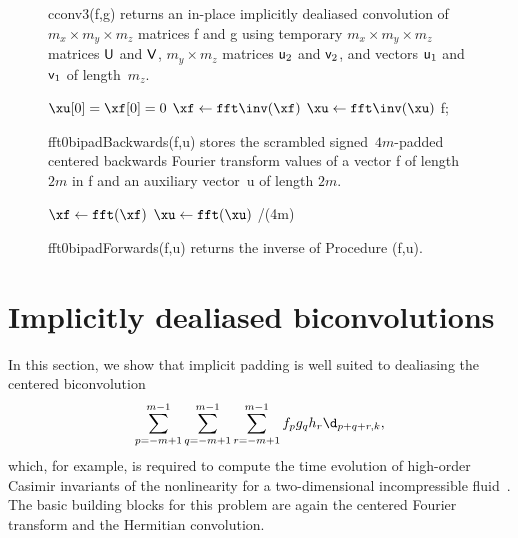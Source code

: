\documentclass[final]{siamltex}
\begin{document}
\begin{figure}[htbp]
\begin{minipage}{0.54\linewidth}
\begin{function}[H]
  \Return \xf\;
\caption{cconv3({\sf f},{\sf g}) 
returns an in-place implicitly dealiased convolution of
\hbox{$m_x\times m_y\times m_z$} matrices {\sf f} and {\sf g} using temporary
\hbox{$m_x\times m_y\times m_z$} matrices ${\sf U}$ and ${\sf V}$, 
$m_y\times m_z$ matrices ${\sf u}_2$ and ${\sf v}_2$,
and vectors ${\sf u}_1$ and ${\sf v}_1$ of length~$m_z$.}\label{cconv3}
\end{function}
\end{minipage}
%
\begin{minipage}{0.46\linewidth}
\begin{procedure}[H]
  $\xu[0]=\xf[0]=0$\;
  $\xf \leftarrow \fft\inv(\xf)$\;
  $\xu \leftarrow \fft\inv(\xu)$\;
  \Return f;
  \caption{fft0bipadBackwards({\sf f},{\sf u}) stores the 
scrambled signed~$4m$-padded centered backwards Fourier transform values of a
vector {\sf f} of length~$2m$ in {\sf f} and an auxiliary vector~{\sf u} of
length $2m$.}\label{fft0bipadBackwards}
\end{procedure}
\begin{function}[H]
  $\xf \leftarrow \fft(\xf)$\;
  $\xu \leftarrow \fft(\xu)$\;
  \Return \xf/(4m)\;
  \caption{fft0bipadForwards({\sf f},{\sf u}) returns the
inverse of Procedure \fftObipadBackwards({\sf f},{\sf u}).}
\label{fft0bipadForwards}
\end{function}
\end{minipage}
\end{figure}

\section{Implicitly dealiased biconvolutions}\label{hyperconv}
In this section, we show that implicit padding is well suited to
dealiasing the centered biconvolution
$$
\sum_{p=-m+1}^{m-1}\sum_{q=-m+1}^{m-1}\sum_{r=-m+1}^{m-1} f_p g_q h_r\d_{p+q+r,k},
$$
which, for example, is required to compute the time evolution of high-order
Casimir invariants of the nonlinearity for a two-dimensional incompressible
fluid~\cite{Bowman10}. The basic building blocks for this problem are again
the centered Fourier transform and the Hermitian convolution.
\end{document}
